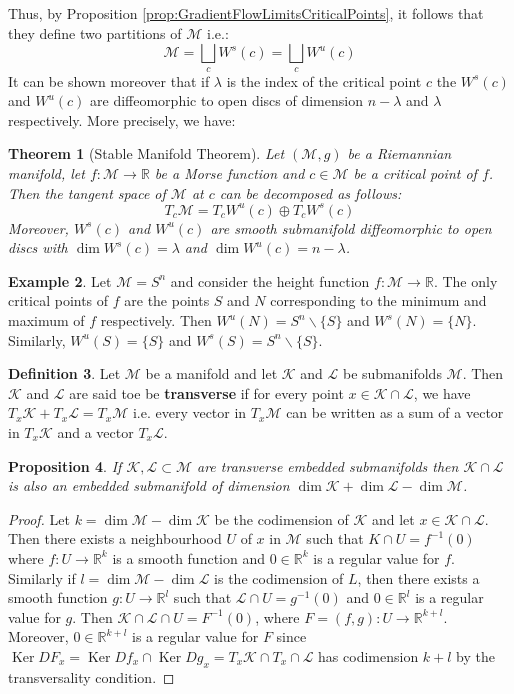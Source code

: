 \documentclass[10pt]{article}
\theoremstyle{plain}
\newtheorem{thm}{Theorem}[section] %
\newtheorem{prop}[thm]{Proposition}
\theoremstyle{definition}
\newtheorem{defn}[thm]{Definition} %
\newtheorem{exmp}[thm]{Example} %
\newcommand{\Real}{\mathbb{R}}
\newcommand{\man}{\mathcal{M}}
\newcommand{\kan}{\mathcal{K}}
\newcommand{\lan}{\mathcal{L}}
\DeclareMathOperator{\Ker}{Ker}
\newcommand{\mysection}[1]{
    \setcounter{thm}{0}
    \section*{#1}
    \addcontentsline{toc}{section}{#1}
    \addtocounter{section}{1}
    \setcounter{subsection}{0}

}
\newcommand{\finv}{f^{-1}}
\newcommand{\ginv}{g^{-1}}
\begin{document}
Thus, by Proposition \ref{prop:GradientFlowLimitsCriticalPoints}, it follows that they define two partitions of $\man$ i.e.:
        $$\man = \bigsqcup\limits_c W^s(c) = \bigsqcup\limits_c W^u(c)$$
It can be shown moreover that if $\lambda$ is the index of the critical point $c$ the $W^s(c)$ and $W^u(c)$ are diffeomorphic to open discs of dimension $n -\lambda$ and $\lambda$ respectively. More precisely, we have:
\begin{thm}[Stable Manifold Theorem]\label{thm:StableManifoldTheorem}
    Let $(\man,g)$ be a Riemannian manifold, let $f:\man \to\Real$ be a Morse function and $c\in \man$ be a critical point of $f$. Then the tangent space of $\man$ at $c$ can be decomposed as follows:
        $$T_c \man = T_c W^u(c) \oplus T_cW^s(c)$$
    Moreover, $W^s(c)$ and $W^u(c)$ are smooth submanifold diffeomorphic to open discs with $\dim W^s(c) = \lambda$ and $\dim W^u(c) = n -\lambda$.
    
\end{thm}

\begin{exmp}
    Let $\man= S^n$ and consider the height function $f : \man \to \Real$. The only critical points of $f$ are the points $S$ and $N$ corresponding to the minimum and maximum of $f$ respectively. Then $W^u(N) = S^n \backslash \{S\}$ and $W^s(N) = \{N\}$. Similarly, $W^u(S) = \{S\}$ and $W^s(S) = S^n \backslash\{S\}$.
\end{exmp}

\begin{defn}
    Let $\man$ be a manifold and let $\mathcal{K}$ and $\mathcal{L}$ be submanifolds $\man$. Then $\mathcal{K}$ and $\mathcal{L}$ are said toe be \textbf{transverse} if for every point $x\in\mathcal{K}\cap\mathcal{L}$, we have $T_x\mathcal{K} + T_x \mathcal{L} = T_x\man$ i.e. every vector in $T_x\man$ can be written as a sum of a vector in $T_x\mathcal{K}$ and a vector $T_x\mathcal{L}$.
\end{defn}

\begin{prop}\label{prop:TranserveEmbeddedDimensionInclusionExclusion}
    If $\kan,\lan \subset \man$ are transverse embedded submanifolds then $\kan \cap \lan$ is also an embedded submanifold of dimension $\dim \kan + \dim \lan - \dim \man$.
\end{prop}

\begin{proof}
    Let $k = \dim \man - \dim \kan$ be the codimension of $\kan$ and let $x\in\kan\cap\lan$. Then there exists a neighbourhood $U$ of $x$ in $\man$ such that $K\cap U = \finv(0)$ where $f:U\to\Real^k$ is a smooth function and $0 \in \Real^k$ is a regular value for $f$. Similarly if $l = \dim \man - \dim \lan$ is the codimension of $L$, then there exists a smooth function $g : U \to \Real^l$ such that $\lan \cap U = \ginv(0)$ and $0\in\Real^l$ is a regular value for $g.$ Then $\kan \cap \lan \cap U = F^{-1}(0)$, where $F = (f,g) : U \to \Real^{k+l}$. Moreover, $0 \in \Real^{k+l}$ is a regular value for $F$ since $\Ker DF_x = \Ker Df_x \cap \Ker Dg_x = T_x\kan\cap T_x\cap\lan$ has codimension $k + l $ by the transversality condition. 
\end{proof}
\end{document}
